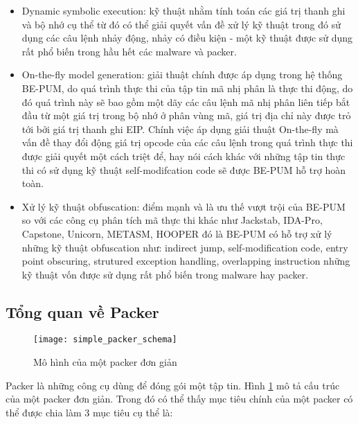 \begin{itemize}
\item{Dynamic symbolic execution: kỹ thuật nhằm tính toán các giá trị thanh ghi và bộ nhớ cụ thể từ đó có thể giải quyết vấn đề xử lý kỹ thuật trong đó sử dụng các câu lệnh nhảy động, nhảy có điều kiện - một kỹ thuật được sử dụng rất phổ biến trong hầu hết các malware và packer.\\}
\item{On-the-fly model generation: giải thuật chính được áp dụng trong hệ thống BE-PUM, do quá trình thực thi của tập tin mã nhị phân là thực thi động, do đó quá trình này sẽ bao gồm một dãy các câu lệnh mã nhị phân liên tiếp bắt đầu từ một giá trị trong bộ nhớ ở phân vùng mã, giá trị địa chỉ này được trỏ tới bởi giá trị thanh ghi EIP. Chính việc áp dụng giải thuật On-the-fly mà vấn đề thay đổi động giá trị opcode của các câu lệnh trong quá trình thực thi được giải quyết một cách triệt để, hay nói cách khác với những tập tin thực thi có sử dụng kỹ thuật self-modifcation code sẽ được BE-PUM hỗ trợ hoàn toàn.\\}
\item{Xử lý kỹ thuật obfuscation: điểm mạnh và là ưu thế vượt trội của BE-PUM so với các công cụ phân tích mã thực thi khác như Jackstab, IDA-Pro, Capstone, Unicorn, METASM, HOOPER đó là BE-PUM có hỗ trợ xử lý những kỹ thuật obfuscation như: indirect jump, self-modification code, entry point obscuring, strutured exception handling, overlapping instruction những kỹ thuật vốn được sử dụng rất phổ biến trong malware hay packer.}
\end{itemize}

\subsection{Tổng quan về Packer}

\begin{figure}[h]
\centering
\texttt{[image: simple\_packer\_schema]}
\caption{Mô hình của một packer đơn giản}
\label{fig:PackerSchema}
\end{figure}

\hspace{0.5cm}Packer là những công cụ dùng để đóng gói một tập tin. Hình \ref {fig:PackerSchema} mô tả cấu trúc của một packer đơn giản. Trong đó có thể thấy mục tiêu chính của một packer có thể được chia làm 3 mục tiêu cụ thể là:

